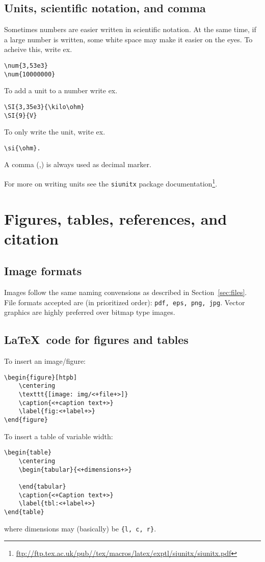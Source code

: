\subsection{Units, scientific notation, and comma}
Sometimes numbers are easier written in scientific notation. At the same time, if a large number is written, some white space may make it easier on the eyes. To acheive this, write ex.
\begin{verbatim}
\num{3,53e3} 
\num{10000000}
\end{verbatim}
To add a unit to a number write ex.
\begin{verbatim}
\SI{3,35e3}{\kilo\ohm}
\SI{9}{V}
\end{verbatim}
To only write the unit, write ex.
\begin{verbatim}
\si{\ohm}. 
\end{verbatim}
A comma (,) is always used as decimal marker.


For more on writing units see the \texttt{siunitx} package documentation\footnote{\url{ftp://ftp.tex.ac.uk/pub//tex/macros/latex/exptl/siunitx/siunitx.pdf}}.


\section{Figures, tables, references, and citation}
\label{sec:figtabref}
\subsection{Image formats}
Images follow the same naming convensions as described in Section~\ref{sec:files}. File formats accepted are (in prioritized order): \texttt{pdf, eps, png, jpg}. Vector graphics are highly preferred over bitmap type images.


\subsection{\LaTeX\ code for figures and tables}
To insert an image\slash figure:
\begin{verbatim}
\begin{figure}[htpb]
    \centering
    \texttt{[image: img/<+file+>]}
    \caption{<+caption text+>}
    \label{fig:<+label+>}
\end{figure}
\end{verbatim}


To insert a table of variable width:
\begin{verbatim}
\begin{table}
    \centering
    \begin{tabular}{<+dimensions+>}

    \end{tabular}
    \caption{<+Caption text+>}
    \label{tbl:<+label+>}
\end{table}
\end{verbatim}
where dimensions may (basically) be \texttt{\{l, c, r\}}.



